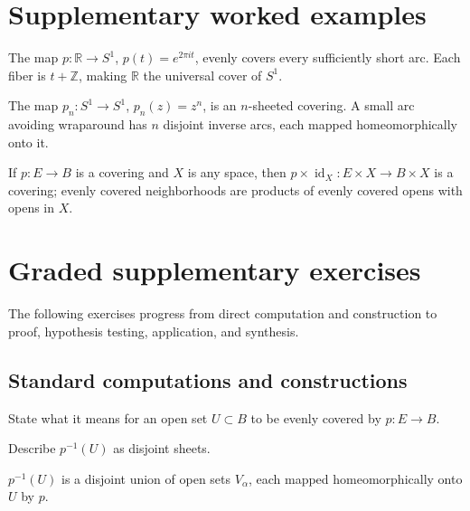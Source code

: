 \section{Supplementary worked examples}
\label{sec:viii10-pedagogy}

\begin{example}\label{ex:viii10-ped-01}
The map $p:\mathbb R\to S^1$, $p(t)=e^{2\pi it}$, evenly covers every sufficiently short arc.  Each fiber is $t+\mathbb Z$, making $\mathbb R$ the universal cover of $S^1$.
\end{example}

\begin{example}\label{ex:viii10-ped-02}
The map $p_n:S^1\to S^1$, $p_n(z)=z^n$, is an $n$-sheeted covering.  A small arc avoiding wraparound has $n$ disjoint inverse arcs, each mapped homeomorphically onto it.
\end{example}

\begin{example}\label{ex:viii10-ped-03}
If $p:E\to B$ is a covering and $X$ is any space, then $p\times\operatorname{id}_X:E\times X\to B\times X$ is a covering; evenly covered neighborhoods are products of evenly covered opens with opens in $X$.
\end{example}

\section{Graded supplementary exercises}
The following exercises progress from direct computation and construction to proof, hypothesis testing, application, and synthesis.

\subsection*{Standard computations and constructions}

\begin{exercise}\label{exr:viii10-ped-01}
State what it means for an open set $U\subset B$ to be evenly covered by $p:E\to B$.
\end{exercise}
\begin{hint}
Describe $p^{-1}(U)$ as disjoint sheets.
\end{hint}
\begin{solution}
$p^{-1}(U)$ is a disjoint union of open sets $V_\alpha$, each mapped homeomorphically onto $U$ by $p$.
\end{solution}

